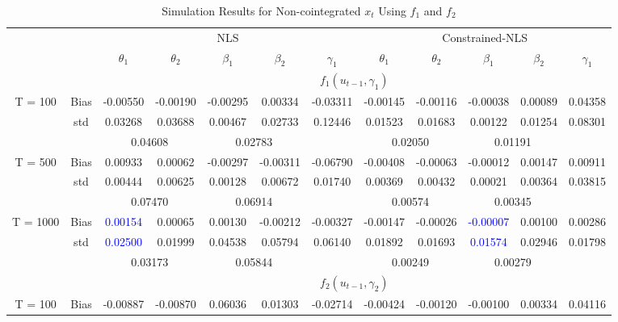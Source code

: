 \documentclass[a4paper,12pt,times,numbered,print,index]{report}
\numberwithin{equation}{section}
\begin{document}
\begin{table}[htbp]
	\centering
	\caption{Simulation Results for Non-cointegrated $x_t$ Using $f_1$ and $f_2$}
	\begin{adjustbox}{max width=\textwidth}
		\begin{tabular}{cccccccccccc}
		\toprule
		&       & \multicolumn{5}{c}{NLS}               & \multicolumn{5}{c}{Constrained-NLS} \\
		&       & $\theta_1$ & $\theta_2$ & $\beta_1$ & $\beta_2$ & $\gamma_1$ & $\theta_1$ & $\theta_2$ & $\beta_1$ & $\beta_2$ & $\gamma_1$ \\
		\midrule
		&       & \multicolumn{10}{c}{$f_1 (u_{t-1}, \gamma_1)$}                \\
		\midrule
		\multirow{3}[1]{*}{T = 100} & Bias  & -0.00550 & -0.00190 & -0.00295 & 0.00334 & -0.03311 & -0.00145 & -0.00116 & -0.00038 & 0.00089 & 0.04358 \\
		& std   & 0.03268 & 0.03688 & 0.00467 & 0.02733 & 0.12446 & 0.01523 & 0.01683 & 0.00122 & 0.01254 & 0.08301 \\
		&       & \multicolumn{2}{c}{0.04608} & \multicolumn{2}{c}{0.02783} &       & \multicolumn{2}{c}{0.02050} & \multicolumn{2}{c}{0.01191} &  \\
		\multirow{3}[0]{*}{T = 500} & Bias  & 0.00933 & 0.00062 & -0.00297 & -0.00311 & -0.06790 & -0.00408 & -0.00063 & -0.00012 & 0.00147 & 0.00911 \\
		& std   & 0.00444 & 0.00625 & 0.00128 & 0.00672 & 0.01740 & 0.00369 & 0.00432 & 0.00021 & 0.00364 & 0.03815 \\
		&       & \multicolumn{2}{c}{0.07470} & \multicolumn{2}{c}{0.06914} &       & \multicolumn{2}{c}{0.00574} & \multicolumn{2}{c}{0.00345} &  \\
		\multirow{3}[1]{*}{T = 1000} & Bias  & \textcolor{blue}{0.00154} & 0.00065 & 0.00130 & -0.00212 & -0.00327 & -0.00147 & -0.00026 & \textcolor{blue}{-0.00007} & 0.00100 & 0.00286 \\
		& std   & \textcolor{blue}{0.02500} & 0.01999 & 0.04538 & 0.05794 & 0.06140 & 0.01892 & 0.01693 & \textcolor{blue}{0.01574} & 0.02946 & 0.01798 \\
		&       & \multicolumn{2}{c}{0.03173} & \multicolumn{2}{c}{0.05844} &       & \multicolumn{2}{c}{0.00249} & \multicolumn{2}{c}{0.00279} &  \\
		\midrule
		&       & \multicolumn{10}{c}{$f_2 (u_{t-1}, \gamma_2)$}                \\
		\midrule
		\multirow{3}[1]{*}{T = 100} & Bias  & -0.00887 & -0.00870 & 0.06036 & 0.01303 & -0.02714 & -0.00424 & -0.00120 & -0.00100 & 0.00334 & 0.04116 \\

\end{tabular}
\end{adjustbox}
\end{table}
\end{document}
